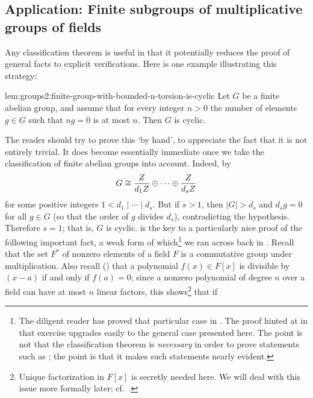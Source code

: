 \subsection{Application: Finite subgroups of multiplicative groups of
  fields}
\label{subsec:groups2:application-finite-subgroups-of-multiplicative-groups-of-fields}
Any classification theorem is useful in that it potentially reduces
the proof of general facts to explicit verifications. Here is one
example illustrating this strategy:
\begin{lem}{}{lem:groups2:finite-group-with-bounded-n-torsion-is-cyclic}
  Let $G$ be a finite abelian group, and assume that for every integer
  $n > 0$ the number of elements $g \in G$ such that $ng = 0$ is at
  most $n$. Then $G$ is cyclic.
\end{lem}
The reader should try to prove this `by hand', to appreciate the fact
that it is not entirely trivial. It does become essentially immediate
once we take the classification of finite abelian groups into account.
Indeed, by 
\[G \cong \frac{Z}{d_1Z} \oplus \cdots \oplus \frac{Z}{d_sZ}\] for
some positive integers $1 < d_1 \mid \cdots \mid d_s$. But if $s > 1$,
then $|G| > d_s$ and $d_s g = 0$ for all $g \in G$ (so that the order
of $g$ divides $d_s$), contradicting the hypothesis.  Therefore
$s = 1$; that is, $G$ is cyclic.   is the key to
a particularly nice proof of the following important fact, a weak form
of which\footnote{The diligent reader has proved that particular case
  in . The proof hinted at in that
  exercise upgrades easily to the general case presented here. The
  point is not that the classification theorem is \emph{necessary} in
  order to prove statements such as ; the point
  is that it makes such statements nearly evident.} we ran across back
in . Recall that the set $F^*$
of nonzero elements of a field $F$ is a commutative group under
multiplication. Also recall ()
that a polynomial $f(x) \in F[x]$ is divisible by $(x - a)$ if and
only if $f(a) = 0$; since a nonzero polynomial of degree $n$ over a
field can have at most $n$ linear factors, this shows\footnote{Unique
  factorization in $F[x]$ is secretly needed here. We will deal with
  this issue more formally later; cf.\ .} that if
